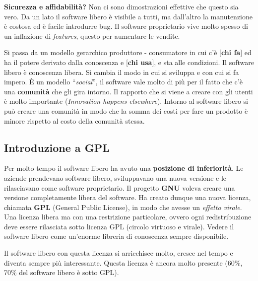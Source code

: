 \textbf{Sicurezza e affidabilità?} Non ci sono dimostrazioni effettive che questo sia vero. Da un lato il software libero è visibile a tutti, ma dall'altro la manutenzione è costosa ed è facile introdurre bug. Il software proprietario vive molto spesso di un inflazione di \textit{features}, questo per aumentare le vendite.


Si passa da un modello gerarchico produttore - consumatore in cui c'è [\textbf{chi fa}] ed ha il potere derivato dalla conoscenza e [\textbf{chi usa}], e sta alle condizioni. Il software libero è conoscenza libera. Si cambia il modo in cui si sviluppa e con cui si fa impero. È un modello ``\textit{social}'', il software vale molto di più per il fatto che c'è una \textbf{comunità} che gli gira intorno. Il rapporto che si viene a creare con gli utenti è molto importante (\textit{Innovation happens elsewhere}). Intorno al software libero si può creare una comunità in modo che la somma dei costi per fare un prodotto è minore rispetto al costo della comunità stessa.

\subsection{Introduzione a GPL}

Per molto tempo il software libero ha avuto una \textbf{posizione di inferiorità}. Le aziende prendevano software libero, sviluppavano una nuova versione e le rilasciavano come software proprietario. Il progetto \textbf{GNU} voleva creare una versione completamente libera del software. Ha creato dunque una nuova licenza, chiamata \textbf{GPL} (General Public License), in modo che avesse un \textit{effetto virale}. Una licenza libera ma con una restrizione particolare, ovvero ogni redistribuzione deve essere rilasciata sotto licenza GPL (circolo virtuoso e virale). Vedere il software libero come un'enorme libreria di conoscenza sempre disponibile.

Il software libero con questa licenza si arricchisce molto, cresce nel tempo e diventa sempre più interessante. Questa licenza è ancora molto presente (60\%, 70\% del software libero è sotto GPL).
